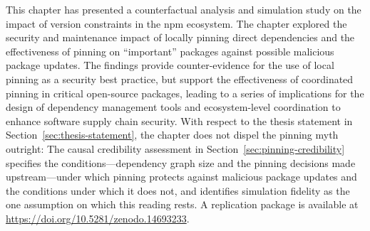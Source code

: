 This chapter has presented a counterfactual analysis and simulation study on the impact of version constraints in the npm ecosystem.
The chapter explored the security and maintenance impact of locally pinning direct dependencies and the effectiveness of pinning on ``important'' packages against possible malicious package updates.
The findings provide counter-evidence for the use of local pinning as a security best practice, but support the effectiveness of coordinated pinning in critical open-source packages, leading to a series of implications for the design of dependency management tools and ecosystem-level coordination to enhance software supply chain security.
With respect to the thesis statement in Section~\ref{sec:thesis-statement}, the chapter does not dispel the pinning myth outright: The causal credibility assessment in Section~\ref{sec:pinning-credibility} specifies the conditions---dependency graph size and the pinning decisions made upstream---under which pinning protects against malicious package updates and the conditions under which it does not, and identifies simulation fidelity as the one assumption on which this reading rests.
A replication package is available at \url{https://doi.org/10.5281/zenodo.14693233}.

